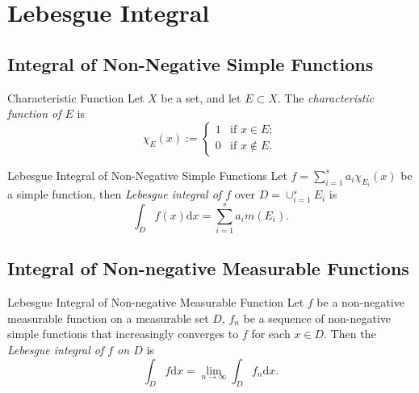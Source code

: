 

\section{Lebesgue Integral}

\subsection{Integral of Non-Negative Simple Functions}

\begin{definition}{Characteristic Function}{}
  Let $X$ be a set, and let $E \subset X$.
  The \emph{characteristic function of $E$} is
  \begin{equation}
    \chi_E(x) :=
    \begin{cases}
      1 & \text{if } x \in E;\\
      0 & \text{if } x \not \in E.
    \end{cases}
  \end{equation}
\end{definition}

\begin{definition}{Lebesgue Integral of Non-Negative Simple Functions}{}
  Let $f = \sum _{i = 1}^s a_i \chi_{E_i}(x)$ be a simple function,
  then \emph{Lebesgue integral of $f$} over $D = \cup _{i = 1}^s E_i$ is
  \begin{equation}
    \int_D f(x)\mathrm{d} x = \sum\limits_{i = 1}^s a_i m(E_i).
  \end{equation}
\end{definition}

\subsection{Integral of Non-negative Measurable Functions}

\begin{definition}{Lebesgue Integral of Non-negative Measurable Function}{}
  Let $f$ be a non-negative measurable function on a measurable set $D$,
  $f_n$ be a sequence of non-negative simple functions that increasingly
  converges to $f$ for each $x \in D$.
  Then the \emph{Lebesgue integral of $f$ on $D$} is
  \begin{equation}
    \int_D f \mathrm{d} x= \lim \limits _{n \rightarrow \infty} \int_D f_n \mathrm{d} x.
  \end{equation}
\end{definition}

